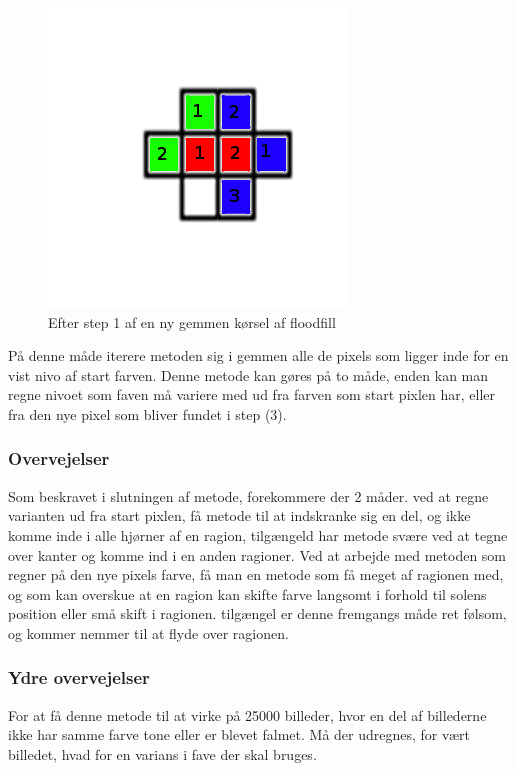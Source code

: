 \begin{figure}[h]
	\begin{center}
		\includegraphics[scale=0.42,angle=0]{afsnit/vores_implementation/billeder/flood_fill/floodfill4}
	\end{center}
	\caption[]{Efter step 1 af en ny gemmen kørsel af floodfill}
	\label{floodfill4}
\end{figure}

På denne måde iterere metoden sig i gemmen alle de pixels som ligger inde for en vist nivo af start farven. Denne metode kan gøres på to måde, enden kan man regne nivoet som faven må variere med ud fra farven som start pixlen har, eller fra den nye pixel som bliver fundet i step (3).

\subsubsection*{Overvejelser}
Som beskravet i slutningen af metode, forekommere der 2 måder. ved at regne varianten ud fra start pixlen, få metode til at indskranke sig en del, og ikke komme inde i alle hjørner af en ragion, tilgængeld har metode svære ved at tegne over kanter og komme ind i en anden ragioner. Ved at arbejde med metoden som regner på den nye pixels farve, få man en metode som få meget af ragionen med, og som kan overskue at en ragion kan skifte farve langsomt i forhold til solens position eller små skift i ragionen. tilgængel er denne fremgangs måde ret følsom, og kommer nemmer til at flyde over ragionen.

\subsubsection*{Ydre overvejelser}
For at få denne metode til at virke på 25000 billeder, hvor en del af billederne ikke har samme farve tone eller er blevet falmet. Må der udregnes, for vært billedet, hvad for en varians i fave der skal bruges.
